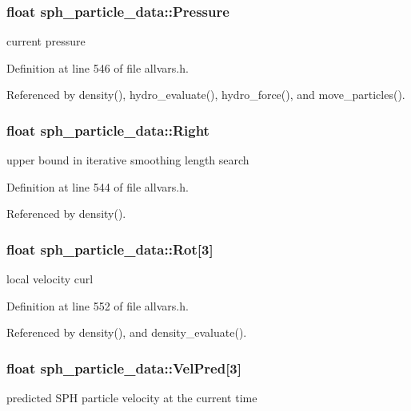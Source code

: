 \hypertarget{structsph__particle__data_a9201a97de5fe06f6ed6fcc33386eccda}{
\subsubsection[{Pressure}]{\setlength{\rightskip}{0pt plus 5cm}float {\bf sph\_\-particle\_\-data::Pressure}}}
\label{structsph__particle__data_a9201a97de5fe06f6ed6fcc33386eccda}
current pressure 

Definition at line 546 of file allvars.h.



Referenced by density(), hydro\_\-evaluate(), hydro\_\-force(), and move\_\-particles().

\hypertarget{structsph__particle__data_ae21f207de0a8a6f53cc891a7556f2592}{
\subsubsection[{Right}]{\setlength{\rightskip}{0pt plus 5cm}float {\bf sph\_\-particle\_\-data::Right}}}
\label{structsph__particle__data_ae21f207de0a8a6f53cc891a7556f2592}
upper bound in iterative smoothing length search 

Definition at line 544 of file allvars.h.



Referenced by density().

\hypertarget{structsph__particle__data_a6b9b7ed346c2d65d50dacd4b43cdd1d2}{
\subsubsection[{Rot}]{\setlength{\rightskip}{0pt plus 5cm}float {\bf sph\_\-particle\_\-data::Rot}\mbox{[}3\mbox{]}}}
\label{structsph__particle__data_a6b9b7ed346c2d65d50dacd4b43cdd1d2}
local velocity curl 

Definition at line 552 of file allvars.h.



Referenced by density(), and density\_\-evaluate().

\hypertarget{structsph__particle__data_a730acdc1da11f80da2214ebb76e6c2b3}{
\subsubsection[{VelPred}]{\setlength{\rightskip}{0pt plus 5cm}float {\bf sph\_\-particle\_\-data::VelPred}\mbox{[}3\mbox{]}}}
\label{structsph__particle__data_a730acdc1da11f80da2214ebb76e6c2b3}
predicted SPH particle velocity at the current time 

